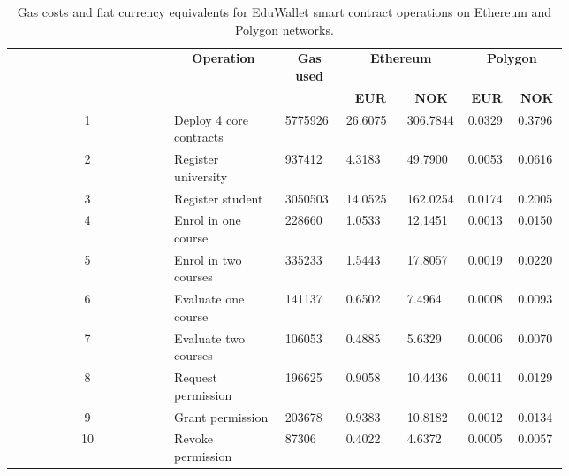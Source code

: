 \begin{table}
\centering
\caption{Gas costs and fiat currency equivalents for EduWallet smart contract operations on Ethereum and Polygon networks.}
\label{tab:systemCosts}
\begin{tabular}{|c|p{0.20\linewidth}|p{0.11\linewidth}|p{0.115\linewidth}|p{0.115\linewidth}|p{0.095\linewidth}|p{0.095\linewidth}|}
\hline
 & \multicolumn{1}{|c|}{\textbf{Operation}} & \multicolumn{1}{|c|}{\textbf{Gas used}} & \multicolumn{2}{c|}{\textbf{Ethereum}} & \multicolumn{2}{c|}{\textbf{Polygon}} \\
\cline{4-7}
& & & \multicolumn{1}{|c|}{\textbf{EUR}} & \multicolumn{1}{|c|}{\textbf{NOK}} & \multicolumn{1}{|c|}{\textbf{EUR}} & \multicolumn{1}{|c|}{\textbf{NOK}} \\
\hline
1 & Deploy 4 core contracts & 5775926 & 26.6075 & 306.7844 & 0.0329 & 0.3796 \\
\hline
2 & Register university & 937412 & 4.3183 & 49.7900 & 0.0053 & 0.0616 \\
\hline
3 & Register student & 3050503 & 14.0525 & 162.0254 & 0.0174 &	0.2005 \\
\hline
4 & Enrol in one course & 228660 & 1.0533 & 12.1451 & 0.0013 & 0.0150 \\
\hline
5 & Enrol in two courses & 335233 & 1.5443 & 17.8057 & 0.0019 & 0.0220 \\
\hline
6 & Evaluate one course & 141137 & 0.6502 & 7.4964 & 0.0008 & 0.0093 \\
\hline
7 & Evaluate two courses & 106053 & 0.4885 & 5.6329 & 0.0006 & 0.0070 \\
\hline
8 & Request permission & 196625 & 0.9058 & 10.4436 & 0.0011 & 0.0129 \\
\hline
9 & Grant permission & 203678 & 0.9383 & 10.8182 & 0.0012 & 0.0134 \\
\hline
10 & Revoke permission & 87306 & 0.4022 & 4.6372 & 0.0005 & 0.0057 \\
\hline
\end{tabular}
\end{table}